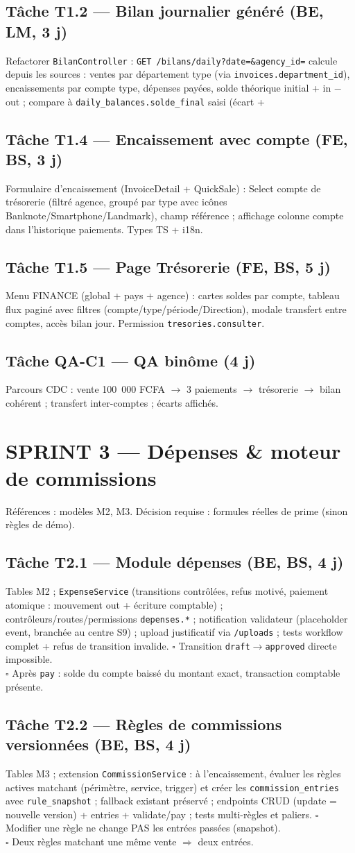 \documentclass[11pt,a4paper]{article}
\newcommand{\tache}[2]{\subsection{Tâche #1 --- #2}\label{task:#1}}
\newcommand{\critere}{$\square$ }
\begin{document}
\tache{T1.2}{Bilan journalier généré (BE, LM, 3 j)}
Refactorer \verb|BilanController| : \verb|GET /bilans/daily?date=&agency_id=| calcule depuis les sources : ventes par département type (via \verb|invoices.department_id|), encaissements par compte type, dépenses payées, solde théorique initial + in $-$ out ; compare à \verb|daily_balances.solde_final| saisi (écart + %

\tache{T1.4}{Encaissement avec compte (FE, BS, 3 j)}
Formulaire d'encaissement (InvoiceDetail + QuickSale) : Select compte de trésorerie (filtré agence, groupé par type avec icônes Banknote/Smartphone/Landmark), champ référence ; affichage colonne compte dans l'historique paiements. Types TS + i18n.

\tache{T1.5}{Page Trésorerie (FE, BS, 5 j)}
Menu FINANCE (global + pays + agence) : cartes soldes par compte, tableau flux paginé avec filtres (compte/type/période/Direction), modale transfert entre comptes, accès bilan jour. Permission \verb|tresories.consulter|.

\tache{QA-C1}{QA binôme (4 j)} Parcours CDC : vente 100~000 FCFA $\rightarrow$ 3 paiements $\rightarrow$ trésorerie $\rightarrow$ bilan cohérent ; transfert inter-comptes ; écarts affichés.

\section{SPRINT 3 --- Dépenses \& moteur de commissions}

Références : modèles M2, M3. Décision requise : formules réelles de prime (sinon règles de démo).

\tache{T2.1}{Module dépenses (BE, BS, 4 j)}
Tables M2 ; \verb|ExpenseService| (transitions contrôlées, refus motivé, paiement atomique : mouvement out + écriture comptable) ; contrôleurs/routes/permissions \verb|depenses.*| ; notification validateur (placeholder event, branchée au centre S9) ; upload justificatif via \verb|/uploads| ; tests workflow complet + refus de transition invalide.
\critere Transition \texttt{draft}$\rightarrow$\texttt{approved} directe impossible. \\
\critere Après \texttt{pay} : solde du compte baissé du montant exact, transaction comptable présente.

\tache{T2.2}{Règles de commissions versionnées (BE, BS, 4 j)}
Tables M3 ; extension \verb|CommissionService| : à l'encaissement, évaluer les règles actives matchant (périmètre, service, trigger) et créer les \verb|commission_entries| avec \verb|rule_snapshot| ; fallback existant préservé ; endpoints CRUD (update = nouvelle version) + entries + validate/pay ; tests multi-règles et paliers.
\critere Modifier une règle ne change PAS les entrées passées (snapshot). \\
\critere Deux règles matchant une même vente $\Rightarrow$ deux entrées.
\end{document}
